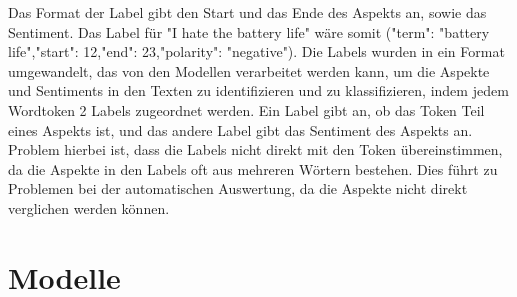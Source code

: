 \documentclass[12pt]{article}
\begin{document}
\newline
\newline
Das Format der Label gibt den Start und das Ende des Aspekts an, sowie das Sentiment. Das Label für "I hate the battery life" wäre somit ("term": "battery life","start": 12,"end": 23,"polarity": "negative"). Die Labels wurden in ein Format umgewandelt, das von den Modellen verarbeitet werden kann, um die Aspekte und Sentiments in den Texten zu identifizieren und zu klassifizieren, indem jedem Wordtoken 2 Labels zugeordnet werden. Ein Label gibt an, ob das Token Teil eines Aspekts ist, und das andere Label gibt das Sentiment des Aspekts an. Problem hierbei ist, dass die Labels nicht direkt mit den Token übereinstimmen, da die Aspekte in den Labels oft aus mehreren Wörtern bestehen. Dies führt zu Problemen bei der automatischen Auswertung, da die Aspekte nicht direkt verglichen werden können.

\section{Modelle}
\end{document}
